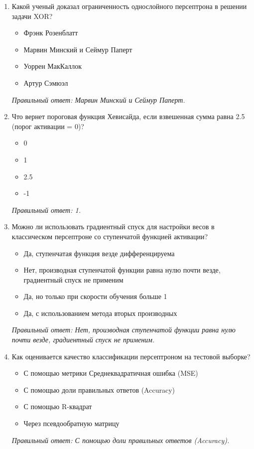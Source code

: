 \begin{enumerate}[label=\textbf{\arabic*.}, leftmargin=0pt, itemsep=1.2em]
\item Какой ученый доказал ограниченность однослойного персептрона в решении задачи XOR?
\begin{itemize}[label=$\square$, leftmargin=1.5cm, itemsep=0.2em, topsep=0.3em]
\item Фрэнк Розенблатт
\item Марвин Минский и Сеймур Паперт
\item Уоррен МакКаллок
\item Артур Сэмюэл
\end{itemize}
{\small\textit{Правильный ответ: Марвин Минский и Сеймур Паперт.}}

\item Что вернет пороговая функция Хевисайда, если взвешенная сумма равна 2.5 (порог активации = 0)?
\begin{itemize}[label=$\square$, leftmargin=1.5cm, itemsep=0.2em, topsep=0.3em]
\item 0
\item 1
\item 2.5
\item -1
\end{itemize}
{\small\textit{Правильный ответ: 1.}}

\item Можно ли использовать градиентный спуск для настройки весов в классическом персептроне со ступенчатой функцией активации?
\begin{itemize}[label=$\square$, leftmargin=1.5cm, itemsep=0.2em, topsep=0.3em]
\item Да, ступенчатая функция везде дифференцируема
\item Нет, производная ступенчатой функции равна нулю почти везде, градиентный спуск не применим
\item Да, но только при скорости обучения больше 1
\item Да, с использованием метода вторых производных
\end{itemize}
{\small\textit{Правильный ответ: Нет, производная ступенчатой функции равна нулю почти везде, градиентный спуск не применим.}}

\item Как оценивается качество классификации персептроном на тестовой выборке?
\begin{itemize}[label=$\square$, leftmargin=1.5cm, itemsep=0.2em, topsep=0.3em]
\item С помощью метрики Среднеквадратичная ошибка (MSE)
\item С помощью доли правильных ответов (Accuracy)
\item С помощью R-квадрат
\item Через псевдообратную матрицу
\end{itemize}
{\small\textit{Правильный ответ: С помощью доли правильных ответов (Accuracy).}}


\end{enumerate}
